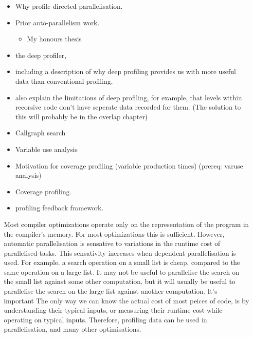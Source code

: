 

\begin{itemize}
\item Why profile directed parallelisation.
\item Prior auto-parallelism work.
\begin{itemize}
    \item My honours thesis
\end{itemize}
\item the deep profiler,
\item including a description of why deep profiling provides us with
      more useful data than conventional profiling.
\item also explain the limitations of deep profiling,
      for example, that levels within recorsive code don't have seperate
      data recorded for them.
      (The solution to this will probably be in the overlap chapter)
\item Callgraph search
\item Variable use analysis
\item Motivation for coverage profiling (variable production times) (prereq:
      varuse analysis)
\item Coverage profiling. 
\item profiling feedback framework.
\end{itemize}


Most compiler optimizations operate only on the representation of the program
in the compiler's memory.
For most optimizations this is sufficient.
However,
automatic parallelisation is sensative to variations in the runtime cost of
parallelised tasks.
This sensativity increases when dependent parallelisation is used.
For example,
a search operation on a small list is cheap, compared to the same operation on
a large list.
It may not be useful to parallelise the search on the small list against some
other computation,
but it will usually be useful to parallelise the search on the large list
against another computation.
It's important 
The only way we can know the actual cost of most peices of code,
is by understanding their typical inputs,
or measuring their runtime cost while operating on typical inputs.
Therefore, profiling data can be used in parallelisation, and many other
optimisations.

